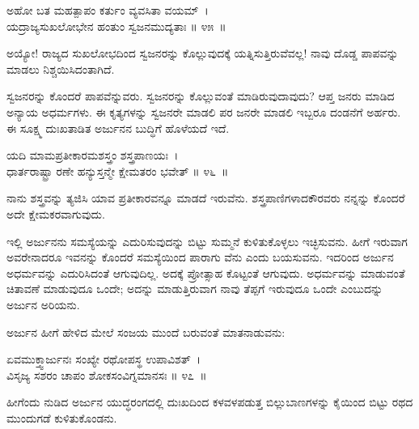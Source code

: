 \begin{shloka}
ಅಹೋ ಬತ ಮಹತ್ಪಾಪಂ ಕರ್ತುಂ ವ್ಯವಸಿತಾ ವಯಮ್~।\\ಯದ್ರಾಜ್ಯಸುಖಲೋಭೇನ ಹಂತುಂ ಸ್ವಜನಮುದ್ಯತಾಃ \hfill॥ ೪೫~॥
\end{shloka}

\begin{artha}
ಅಯ್ಯೋ! ರಾಜ್ಯದ ಸುಖಲೋಭದಿಂದ ಸ್ವಜನರನ್ನು ಕೊಲ್ಲುವುದಕ್ಕೆ ಯತ್ನಿಸುತ್ತಿರುವೆವಲ್ಲ! ನಾವು ದೊಡ್ಡ ಪಾಪವನ್ನು ಮಾಡಲು ನಿಶ್ಚಯಿಸಿದಂತಾಗಿದೆ.
\end{artha}

ಸ್ವಜನರನ್ನು ಕೊಂದರೆ ಪಾಪವೆನ್ನುವರು. ಸ್ವಜನರನ್ನು ಕೊಲ್ಲುವಂತೆ ಮಾಡಿರುವುದಾವುದು? ಆಪ್ತ ಜನರು ಮಾಡಿದ ಅನ್ಯಾಯ ಅಧರ್ಮಗಳು. ಈ ಕೃತ್ಯಗಳನ್ನು ಸ್ವಜನರೇ ಮಾಡಲಿ ಪರ ಜನರೇ ಮಾಡಲಿ ಇಬ್ಬರೂ ದಂಡನೆಗೆ ಅರ್ಹರು. ಈ ಸೂಕ್ಷ್ಮ ದುಃಖತಾಡಿತ ಅರ್ಜುನನ ಬುದ್ಧಿಗೆ ಹೊಳೆಯದೆ ಇದೆ.

\begin{shloka}
ಯದಿ ಮಾಮಪ್ರತೀಕಾರಮಶಸ್ತ್ರಂ ಶಸ್ತ್ರಪಾಣಯಃ~।\\ಧಾರ್ತರಾಷ್ಟ್ರಾ ರಣೇ ಹನ್ಯುಸ್ತನ್ಮೇ ಕ್ಷೇಮತರಂ ಭವೇತ್ \hfill॥ ೪೬~॥
\end{shloka}

\newpage

\begin{artha}
ನಾನು ಶಸ್ತ್ರವನ್ನು ತ್ಯಜಿಸಿ ಯಾವ ಪ್ರತೀಕಾರವನ್ನೂ ಮಾಡದೆ ಇರುವೆನು. ಶಸ್ತ್ರಪಾಣಿಗಳಾದ\break ಕೌರವರು ನನ್ನನ್ನು ಕೊಂದರೆ ಅದೇ ಕ್ಷೇಮಕರವಾಗುವುದು.
\end{artha}

ಇಲ್ಲಿ ಅರ್ಜುನನು ಸಮಸ್ಯೆಯನ್ನು ಎದುರಿಸುವುದನ್ನು ಬಿಟ್ಟು ಸುಮ್ಮನೆ ಕುಳಿತುಕೊಳ್ಳಲು ಇಚ್ಛಿಸುವನು. ಹೀಗೆ ಇರುವಾಗ ಅವರೇನಾದರೂ ಇವನನ್ನು ಕೊಂದರೆ ಸಮಸ್ಯೆಯಿಂದ ಪಾರಾಗು ವೆನು ಎಂದು ಬಯಸುವನು. ಇದರಿಂದ ಅರ್ಜುನ ಅಧರ್ಮವನ್ನು ಎದುರಿಸಿದಂತೆ ಆಗುವುದಿಲ್ಲ. ಅದಕ್ಕೆ ಪ್ರೋತ್ಸಾಹ ಕೊಟ್ಟಂತೆ ಆಗುವುದು. ಅಧರ್ಮವನ್ನು ಮಾಡುವಂತೆ ಚಿತಾವಣೆ ಮಾಡುವುದೂ ಒಂದೇ; ಅದನ್ನು ಮಾಡುತ್ತಿರುವಾಗ ನಾವು ತೆಪ್ಪಗೆ ಇರುವುದೂ ಒಂದೇ ಎಂಬುದನ್ನು ಅರ್ಜುನ ಅರಿಯನು.

ಅರ್ಜುನ ಹೀಗೆ ಹೇಳಿದ ಮೇಲೆ ಸಂಜಯ ಮುಂದೆ ಬರುವಂತೆ ಮಾತನಾಡುವನು:

\vskip 2pt

\begin{shloka}
ಏವಮುಕ್ತ್ವಾರ್ಜುನಃ ಸಂಖ್ಯೇ ರಥೋಪಸ್ಥ ಉಪಾವಿಶತ್~।\\ವಿಸೃಜ್ಯ ಸಶರಂ ಚಾಪಂ ಶೋಕಸಂವಿಗ್ನಮಾನಸಃ \hfill॥ ೪೭~॥
\end{shloka}

\begin{artha}
ಹೀಗೆಂದು ನುಡಿದ ಅರ್ಜುನ ಯುದ್ಧರಂಗದಲ್ಲಿ ದುಃಖದಿಂದ ಕಳವಳಪಡುತ್ತ ಬಿಲ್ಲುಬಾಣಗಳನ್ನು ಕೈಯಿಂದ ಬಿಟ್ಟು ರಥದ ಮುಂದುಗಡೆ ಕುಳಿತುಕೊಂಡನು.
\end{artha}

